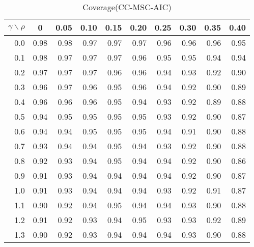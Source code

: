 \documentclass[12pt]{article}
\begin{document}
%
\begin{table}[!tbp]
\caption{Coverage(CC-MSC-AIC)}
 \begin{center}
 \begin{tabular}{r|rrrrrrrrr}\hline\hline
\multicolumn{1}{c|}{$\gamma\backslash\rho$}&\multicolumn{1}{c}{0}&\multicolumn{1}{c}{0.05}&\multicolumn{1}{c}{0.10}&\multicolumn{1}{c}{0.15}&\multicolumn{1}{c}{0.20}&\multicolumn{1}{c}{0.25}&\multicolumn{1}{c}{0.30}&\multicolumn{1}{c}{0.35}&\multicolumn{1}{c}{0.40}\tabularnewline
\hline
0.0&0.98&0.98&0.97&0.97&0.97&0.96&0.96&0.96&0.95\tabularnewline
0.1&0.98&0.97&0.97&0.97&0.96&0.95&0.95&0.94&0.94\tabularnewline
0.2&0.97&0.97&0.97&0.96&0.96&0.94&0.93&0.92&0.90\tabularnewline
0.3&0.96&0.97&0.96&0.95&0.96&0.94&0.92&0.90&0.89\tabularnewline
0.4&0.96&0.96&0.96&0.95&0.94&0.93&0.92&0.89&0.88\tabularnewline
0.5&0.94&0.95&0.95&0.95&0.95&0.93&0.92&0.90&0.87\tabularnewline
0.6&0.94&0.94&0.95&0.95&0.95&0.94&0.91&0.90&0.88\tabularnewline
0.7&0.93&0.94&0.94&0.95&0.94&0.93&0.92&0.90&0.88\tabularnewline
0.8&0.92&0.93&0.94&0.95&0.94&0.94&0.92&0.90&0.86\tabularnewline
0.9&0.91&0.93&0.94&0.94&0.94&0.94&0.92&0.90&0.87\tabularnewline
1.0&0.91&0.93&0.94&0.94&0.94&0.93&0.92&0.91&0.87\tabularnewline
1.1&0.90&0.92&0.94&0.95&0.94&0.94&0.93&0.90&0.88\tabularnewline
1.2&0.91&0.92&0.93&0.94&0.95&0.93&0.93&0.92&0.89\tabularnewline
1.3&0.90&0.92&0.93&0.94&0.94&0.94&0.93&0.90&0.88\tabularnewline
\hline
\end{tabular}

\end{center}

\end{table}
\end{document}

